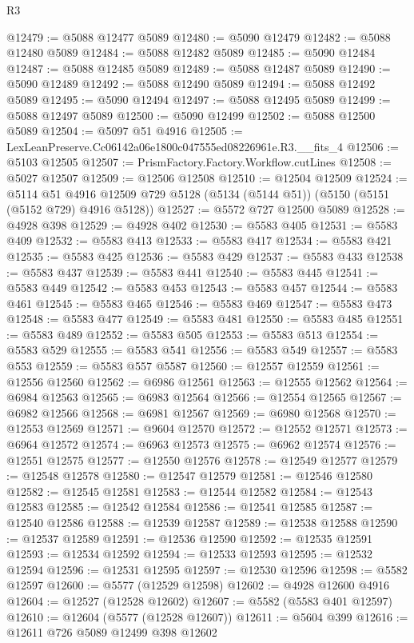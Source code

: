 \begin{lexlean}{R3}
\begin{coremodule}
@12479 := @5088 @12477 @5089
@12480 := @5090 @12479
@12482 := @5088 @12480 @5089
@12484 := @5088 @12482 @5089
@12485 := @5090 @12484
@12487 := @5088 @12485 @5089
@12489 := @5088 @12487 @5089
@12490 := @5090 @12489
@12492 := @5088 @12490 @5089
@12494 := @5088 @12492 @5089
@12495 := @5090 @12494
@12497 := @5088 @12495 @5089
@12499 := @5088 @12497 @5089
@12500 := @5090 @12499
@12502 := @5088 @12500 @5089
@12504 := @5097 @51 @4916
@12505 := LexLeanPreserve.Cc06142a06e1800c047555ed08226961e.R3.__fits_4
@12506 := @5103 @12505
@12507 := PrismFactory.Factory.Workflow.cutLines
@12508 := @5027 @12507
@12509 := @12506 @12508
@12510 := @12504 @12509
@12524 := @5114
    @51
    @4916
    @12509
    @729
    @5128
    (@5134 (@5144 @51))
    (@5150 (@5151 (@5152 @729) @4916 @5128))
@12527 := @5572 @727 @12500 @5089
@12528 := @4928 @398
@12529 := @4928 @402
@12530 := @5583 @405
@12531 := @5583 @409
@12532 := @5583 @413
@12533 := @5583 @417
@12534 := @5583 @421
@12535 := @5583 @425
@12536 := @5583 @429
@12537 := @5583 @433
@12538 := @5583 @437
@12539 := @5583 @441
@12540 := @5583 @445
@12541 := @5583 @449
@12542 := @5583 @453
@12543 := @5583 @457
@12544 := @5583 @461
@12545 := @5583 @465
@12546 := @5583 @469
@12547 := @5583 @473
@12548 := @5583 @477
@12549 := @5583 @481
@12550 := @5583 @485
@12551 := @5583 @489
@12552 := @5583 @505
@12553 := @5583 @513
@12554 := @5583 @529
@12555 := @5583 @541
@12556 := @5583 @549
@12557 := @5583 @553
@12559 := @5583 @557 @5587
@12560 := @12557 @12559
@12561 := @12556 @12560
@12562 := @6986 @12561
@12563 := @12555 @12562
@12564 := @6984 @12563
@12565 := @6983 @12564
@12566 := @12554 @12565
@12567 := @6982 @12566
@12568 := @6981 @12567
@12569 := @6980 @12568
@12570 := @12553 @12569
@12571 := @9604 @12570
@12572 := @12552 @12571
@12573 := @6964 @12572
@12574 := @6963 @12573
@12575 := @6962 @12574
@12576 := @12551 @12575
@12577 := @12550 @12576
@12578 := @12549 @12577
@12579 := @12548 @12578
@12580 := @12547 @12579
@12581 := @12546 @12580
@12582 := @12545 @12581
@12583 := @12544 @12582
@12584 := @12543 @12583
@12585 := @12542 @12584
@12586 := @12541 @12585
@12587 := @12540 @12586
@12588 := @12539 @12587
@12589 := @12538 @12588
@12590 := @12537 @12589
@12591 := @12536 @12590
@12592 := @12535 @12591
@12593 := @12534 @12592
@12594 := @12533 @12593
@12595 := @12532 @12594
@12596 := @12531 @12595
@12597 := @12530 @12596
@12598 := @5582 @12597
@12600 := @5577 (@12529 @12598)
@12602 := @4928 @12600 @4916
@12604 := @12527 (@12528 @12602)
@12607 := @5582 (@5583 @401 @12597)
@12610 := @12604 (@5577 (@12528 @12607))
@12611 := @5604 @399
@12616 := @12611 @726 @5089 @12499 @398 @12602

\end{coremodule}
\end{lexlean}
